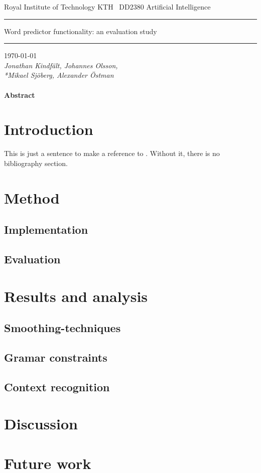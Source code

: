 \documentclass[a4paper, 12pt]{article}
\begin{document}
\begin{titlepage}
\begin{center}
{\Huge \noindent Royal Institute of Technology KTH}
\vspace{15pt}\ 
{\huge \noindent DD2380 Artificial Intelligence}
\vspace{3cm}
\hrule
\vspace{15pt}
{\Huge Word predictor functionality: an evaluation study}
\vspace{15pt}
\hrule
\vspace{1cm}
{\Large\today\\}
\vspace{1em}
{\slshape Jonathan Kindfält, Johannes Olsson,
\\*Mikael Sjöberg, Alexander Östman}
\end{center}
\vspace{1cm}
\paragraph{Abstract}
\lipsum[1]

\end{titlepage}

\section*{Introduction}
This is just a sentence to make a reference to \cite{frey}. Without it, there is no bibliography section.

\tableofcontents

\section{Method}
\lipsum[3-9]
\subsection{Implementation}
\lipsum[1]
\subsection{Evaluation}
\lipsum[1]
\section{Results and analysis}
\lipsum[2-3]
\subsection{Smoothing-techniques}
\lipsum[2-3]
\subsection{Gramar constraints}
\lipsum[2-3]
\subsection{Context recognition}
\lipsum[2-3]
\section{Discussion}
\lipsum[3-9]
\section{Future work}
\lipsum[3-9]


\end{document}
